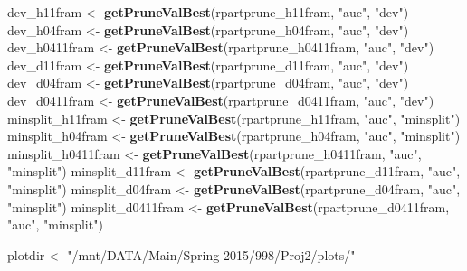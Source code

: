 \documentclass[11pt,]{article}
\newenvironment{Shaded}{\begin{snugshade}}{\end{snugshade}}
\newcommand{\KeywordTok}[1]{\textcolor[rgb]{0.13,0.29,0.53}{\textbf{{#1}}}}
\newcommand{\StringTok}[1]{\textcolor[rgb]{0.31,0.60,0.02}{{#1}}}
\newcommand{\NormalTok}[1]{{#1}}
\begin{document}
\begin{Shaded}
\begin{Highlighting}[]
{\NormalTok{dev_h11fram <-}\StringTok{ }\KeywordTok{getPruneValBest}\NormalTok{(rpartprune_h11fram, }\StringTok{"auc"}\NormalTok{, }\StringTok{"dev"}\NormalTok{)}
\NormalTok{dev_h04fram <-}\StringTok{ }\KeywordTok{getPruneValBest}\NormalTok{(rpartprune_h04fram, }\StringTok{"auc"}\NormalTok{, }\StringTok{"dev"}\NormalTok{)}
\NormalTok{dev_h0411fram <-}\StringTok{ }\KeywordTok{getPruneValBest}\NormalTok{(rpartprune_h0411fram, }\StringTok{"auc"}\NormalTok{, }\StringTok{"dev"}\NormalTok{)}
\NormalTok{dev_d11fram <-}\StringTok{ }\KeywordTok{getPruneValBest}\NormalTok{(rpartprune_d11fram, }\StringTok{"auc"}\NormalTok{, }\StringTok{"dev"}\NormalTok{)}
\NormalTok{dev_d04fram <-}\StringTok{ }\KeywordTok{getPruneValBest}\NormalTok{(rpartprune_d04fram, }\StringTok{"auc"}\NormalTok{, }\StringTok{"dev"}\NormalTok{)}
\NormalTok{dev_d0411fram <-}\StringTok{ }\KeywordTok{getPruneValBest}\NormalTok{(rpartprune_d0411fram, }\StringTok{"auc"}\NormalTok{, }\StringTok{"dev"}\NormalTok{)}
\NormalTok{minsplit_h11fram <-}\StringTok{ }\KeywordTok{getPruneValBest}\NormalTok{(rpartprune_h11fram, }\StringTok{"auc"}\NormalTok{, }\StringTok{"minsplit"}\NormalTok{)}
\NormalTok{minsplit_h04fram <-}\StringTok{ }\KeywordTok{getPruneValBest}\NormalTok{(rpartprune_h04fram, }\StringTok{"auc"}\NormalTok{, }\StringTok{"minsplit"}\NormalTok{)}
\NormalTok{minsplit_h0411fram <-}\StringTok{ }\KeywordTok{getPruneValBest}\NormalTok{(rpartprune_h0411fram, }\StringTok{"auc"}\NormalTok{, }\StringTok{"minsplit"}\NormalTok{)}
\NormalTok{minsplit_d11fram <-}\StringTok{ }\KeywordTok{getPruneValBest}\NormalTok{(rpartprune_d11fram, }\StringTok{"auc"}\NormalTok{, }\StringTok{"minsplit"}\NormalTok{)}
\NormalTok{minsplit_d04fram <-}\StringTok{ }\KeywordTok{getPruneValBest}\NormalTok{(rpartprune_d04fram, }\StringTok{"auc"}\NormalTok{, }\StringTok{"minsplit"}\NormalTok{)}
\NormalTok{minsplit_d0411fram <-}\StringTok{ }\KeywordTok{getPruneValBest}\NormalTok{(rpartprune_d0411fram, }\StringTok{"auc"}\NormalTok{, }\StringTok{"minsplit"}\NormalTok{)}

\NormalTok{plotdir <-}\StringTok{ "/mnt/DATA/Main/Spring 2015/998/Proj2/plots/"}

}
\end{Highlighting}
\end{Shaded}
\end{document}
